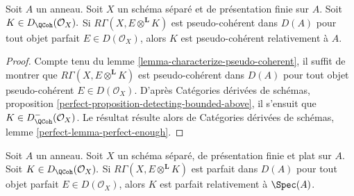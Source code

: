 \begin{lemma}
\label{lemma-characterize-pseudo-coh-improved}
Soit $A$ un anneau. Soit $X$ un schéma séparé et
de présentation finie sur $A$. Soit
$K \in D_\QCoh(\mathcal{O}_X).$ Si
$R \Gamma (X, E \otimes ^{\mathbf{L}} K)$ est
pseudo-cohérent dans $D(A)$ pour tout objet parfait
$E \in D(\mathcal{O}_X)$, alors $K$ est pseudo-cohérent
relativement à $A$.
\end{lemma}

\begin{proof}
Compte tenu du lemme \ref{lemma-characterize-pseudo-coherent}, il suffit
de montrer que $R \Gamma (X, E \otimes ^{\mathbf{L}} K)$ est
pseudo-cohérent dans $D(A)$ pour tout objet pseudo-cohérent
$E \in D(\mathcal{O}_X)$. D'après Catégories dérivées de schémas,
proposition \ref{perfect-proposition-detecting-bounded-above},
il s'ensuit que $K \in D^-_\QCoh (\mathcal{O}_X)$. Le
résultat résulte alors de Catégories dérivées de schémas, lemme
\ref{perfect-lemma-perfect-enough}.
\end{proof}

\begin{lemma}
\label{lemma-characterize-relatively-perfect}
Soit $A$ un anneau. Soit $X$ un schéma séparé, de
présentation finie et plat sur $A$. Soit
$K \in D_\QCoh(\mathcal{O}_X).$ Si
$R \Gamma (X, E \otimes^\mathbf{L} K)$ est parfait dans
$D(A)$ pour tout objet parfait $E \in D(\mathcal{O}_X)$, alors $K$ est
parfait relativement à $\Spec(A)$.
\end{lemma}

